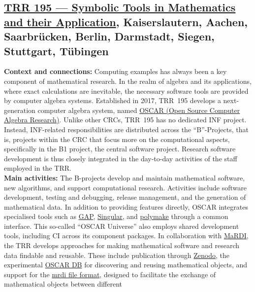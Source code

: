\documentclass{eceasst}
\begin{document}
\subsection{\href{https://www.computeralgebra.de/sfb/}{TRR 195 --- Symbolic Tools in Mathematics and their Application}, Kaiserslautern, Aachen, Saarbrücken, Berlin, Darmstadt, Siegen, Stuttgart, Tübingen}
\label{subsec:trr195}
\noindent\textbf{Context and connections:}
Computing examples has always been a key component of mathematical research.
In the realm of algebra and its applications, where exact calculations are inevitable,
the necessary software tools are provided by computer algebra systems. Established in 2017, TRR~195
develops a next-generation computer algebra system, named \href{https://www.oscar-system.org}{OSCAR
(Open Source Computer Algebra Research)}.
Unlike other CRCs, TRR~195 has no dedicated INF project. Instead, INF-related responsibilities are
distributed across the ``B''-Projects, that is, projects within the CRC that focus more on the
computational aspects, specifically in the B1 project, the central software project. Research
software development is thus closely integrated in the day-to-day activities of the staff employed
in the TRR.
\\
\noindent\textbf{Main activities:}
The B-projects develop and maintain mathematical software, new algorithms, and support computational
research. Activities include software development, testing and debugging, release management, and
the generation of mathematical data.
In addition to providing features directly, OSCAR
integrates specialised tools such as
\href{https://www.gap-system.org/}{GAP},
\href{https://www.singular.uni-kl.de/}{Singular},
and \href{https://polymake.org/}{polymake}
through a common interface.
This so-called ``OSCAR Universe'' also employs shared
development tools, including CI across its component packages.
In collaboration with
\href{https://www.mardi4nfdi.de/}{MaRDI},
the TRR develops approaches for making mathematical
software and research data findable and reusable.
These include publication through
\href{https://zenodo.org/}{Zenodo},
the experimental
\href{https://docs.oscar-system.org/stable/Experimental/OscarDB/introduction/}
{OSCAR DB} for discovering and reusing mathematical
objects, and support for the
\href{https://portal.mardi4nfdi.de/wiki/Mrdi_File_Format}
{mrdi file format}, designed to facilitate the
exchange of mathematical objects between different
\end{document}
